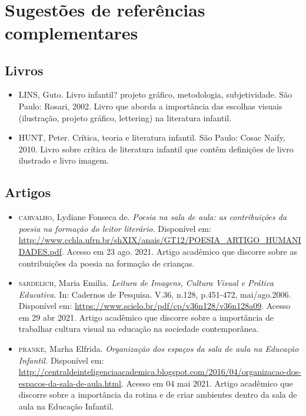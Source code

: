 \documentclass[11pt]{extarticle}
\begin{document}
 
\section{Sugestões de referências complementares}

\subsection{Livros} 

\begin{itemize}
\item LINS, Guto. Livro infantil? projeto gráfico, metodologia, subjetividade. São Paulo: Rosari, 2002.
Livro que aborda a importância das escolhas visuais (ilustração, projeto gráfico, lettering) na literatura infantil.  

\item HUNT, Peter. Crítica, teoria e literatura infantil. São Paulo: Cosac Naify, 2010.
Livro sobre crítica de literatura infantil que contêm definições de livro ilustrado e livro imagem. 
\end{itemize}

\subsection{Artigos}

\begin{itemize}

	\item \textsc{carvalho}, Lydiane Fonseca de. \emph{Poesia na sala de aula: as contribuições da poesia na formação
	do leitor literário.} Disponível em: \url{http://www.cchla.ufrn.br/shXIX/anais/GT12/POESIA_ARTIGO_HUMANIDADES.pdf}. Acesso em 23 ago. 2021.
	Artigo acadêmico que discorre sobre as contribuições da poesia na formação de crianças.
	\item \textsc{sardelich}, Maria Emilia. \emph{Leitura de Imagens, Cultura Visual e Prática Educativa.} 
In: Cadernos de Pesquisa. V.36, n.128, p.451-472, mai/ago.2006. Disponível em: \url{https://www.scielo.br/pdf/cp/v36n128/v36n128a09}. 
Acesso em 29 abr 2021. 
Artigo acadêmico que discorre sobre a importância de trabalhar cultura 
visual na educação na sociedade contemporânea. 

\item \textsc{pranke}, Marha Elfrida. \emph{Organização dos espaços da sala de aula na Educação Infantil.} Disponível em: 
\url{http://centraldeinteligenciaacademica.blogspot.com/2016/04/organizacao-dos-espacos-da-sala-de-aula.html}. Acesso em 04 mai 2021. 
Artigo acadêmico que discorre sobre a importância da rotina e de criar ambientes dentro da sala de aula na Educação Infantil.  
\end{itemize}
\end{document}
